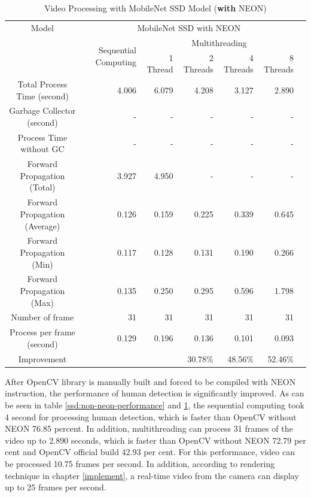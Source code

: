             \begin{table}[!htp]\centering
                \scriptsize
                \begin{tabular}{lrrrrrrr}\toprule
                    \multicolumn{2}{c}{Model} &\multicolumn{5}{c}{MobileNet SSD with NEON} \\\cmidrule{1-7}
                    \multicolumn{2}{c}{\multirow{2}{*}{}} &\multirow{2}{*}{Sequential Computing} &\multicolumn{4}{c}{Multithreading} \\\cmidrule{4-7}
                    & & &1 Thread &2 Threads &4 Threads &8 Threads \\\midrule
                    \multicolumn{2}{c}{Total Process Time (second)} &4.006 &6.079 &4.208 &3.127 &2.890 \\
                    \multicolumn{2}{c}{Garbage Collector (second)} &- &- &- &- &- \\
                    \multicolumn{2}{c}{Process Time without GC} &- &- &- &- &- \\
                    \multicolumn{2}{c}{Forward Propagation (Total)} &3.927 &4.950 &- &- &- \\
                    \multicolumn{2}{c}{Forward Propagation (Average)} &0.126 &0.159 &0.225 &0.339 &0.645 \\
                    \multicolumn{2}{c}{Forward Propagation (Min)} &0.117 &0.128 &0.131 &0.190 &0.266 \\
                    \multicolumn{2}{c}{Forward Propagation (Max)} &0.135 &0.250 &0.295 &0.596 &1.798 \\
                    \multicolumn{2}{c}{Number of frame} &31 &31 &31 &31 &31 \\
                    \multicolumn{2}{c}{Process per frame (second)} &0.129 &0.196 &0.136 &0.101 &0.093 \\
                    \multicolumn{2}{c}{Improvement} & & &30.78\% &48.56\% &52.46\% \\
                    \bottomrule
                \end{tabular}

                \caption{Video Processing with MobileNet SSD Model ({\bf with} NEON)}\label{ssd:neon-performance}
            \end{table}

            After OpenCV library is manually built and forced to be compiled with NEON instruction,
            the performance of human detection is significantly improved.
            As can be seen in table \ref{ssd:non-neon-performance} and \ref{ssd:neon-performance},
            the sequential computing took 4 second for processing human detection,
            which is faster than OpenCV without NEON 76.85 percent.
            In addition, multithreading can process 31 frames of the video up to 2.890 seconds,
            which is faster than OpenCV without NEON 72.79 per cent and OpenCV official build 42.93 per cent.
            For this performance, video can be processed 10.75 frames per second.
            In addition, according to rendering technique in chapter \ref{implement},
            a real-time video from the camera can display up to 25 frames per second.

